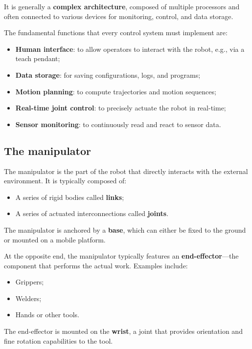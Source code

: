 It is generally a \textbf{complex architecture}, composed of multiple processors and often connected to various devices for monitoring, control, and data storage.

The fundamental functions that every control system must implement are:
\begin{itemize}
  \item \textbf{Human interface}: to allow operators to interact with the robot, e.g., via a teach pendant;
  \item \textbf{Data storage}: for saving configurations, logs, and programs;
  \item \textbf{Motion planning}: to compute trajectories and motion sequences;
  \item \textbf{Real-time joint control}: to precisely actuate the robot in real-time;
  \item \textbf{Sensor monitoring}: to continuously read and react to sensor data.
\end{itemize}

\hfill

\subsection{The manipulator}

The manipulator is the part of the robot that directly interacts with the external environment. It is typically composed of:

\begin{itemize}
  \item A series of rigid bodies called \textbf{links};
  \item A series of actuated interconnections called \textbf{joints}.
\end{itemize}

The manipulator is anchored by a \textbf{base}, which can either be fixed to the ground or mounted on a mobile platform.

At the opposite end, the manipulator typically features an \textbf{end-effector}—the component that performs the actual work. Examples include:
\begin{itemize}
  \item Grippers;
  \item Welders;
  \item Hands or other tools.
\end{itemize}

The end-effector is mounted on the \textbf{wrist}, a joint that provides orientation and fine rotation capabilities to the tool.

